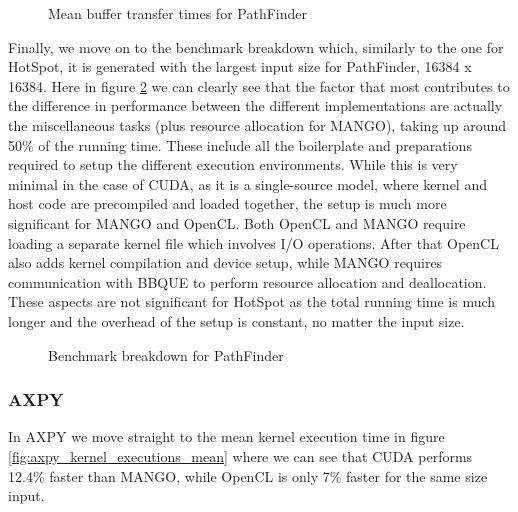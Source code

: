\begin{figure}%
    \centering
    \qquad
    \captionsetup{justification=centering}
    \caption{Mean buffer transfer times for PathFinder}%
    \label{fig:pathfinder_buffer_transfers_mean}%
\end{figure}

Finally, we move on to the benchmark breakdown which, similarly to the one for HotSpot, it is generated with the largest input size for PathFinder, 16384 x 16384. Here in figure \ref{fig:pathfinder_breakdown} we can clearly see that the factor that most contributes to the difference in performance between the different implementations are actually the miscellaneous tasks (plus resource allocation for MANGO), taking up around 50\% of the running time. These include all the boilerplate and preparations required to setup the different execution environments. While this is very minimal in the case of CUDA, as it is a single-source model, where kernel and host code are precompiled and loaded together, the setup is much more significant for MANGO and OpenCL. Both OpenCL and MANGO require loading a separate kernel file which involves I/O operations. After that OpenCL also adds kernel compilation and device setup, while MANGO requires communication with BBQUE to perform resource allocation and deallocation. These aspects are not significant for HotSpot as the total running time is much longer and the overhead of the setup is constant, no matter the input size.

\begin{figure}
    \centering
    \resizebox{!}{160pt}{
        
    }
    \captionsetup{justification=centering}
    \caption{Benchmark breakdown for PathFinder}
    \label{fig:pathfinder_breakdown}
\end{figure}

\subsubsection{AXPY}

In AXPY we move straight to the mean kernel execution time in figure \ref{fig:axpy_kernel_executions_mean} where we can see that CUDA performs 12.4\% faster than MANGO, while OpenCL is only 7\% faster for the same size input.


